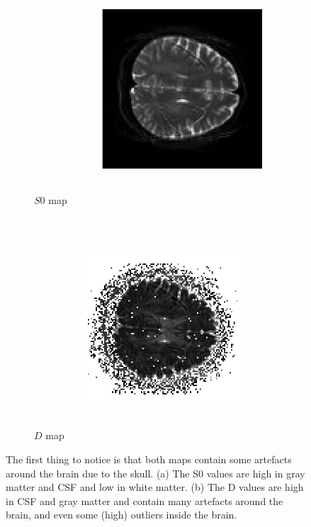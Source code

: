 \documentclass[11pt,a4paper,oneside]{report}
\begin{document}
\begin{figure}[H]
  \centering
  \begin{subfigure}[b]{0.5\textwidth}
      \centering
    \includegraphics[scale=1]{figures/q1/q114-S0.eps}
    \caption{$S0$ map}
    \label{q114-S0}
  \end{subfigure}%
  ~
  \begin{subfigure}[b]{0.5\textwidth}
      \centering
    \includegraphics[scale=1]{figures/q1/q114-D.eps}
    \caption{$D$ map}
    \label{q114-D}
  \end{subfigure}%
  \caption{The first thing to notice is that both maps contain some artefacts around the brain due to the skull. (a) The S0 values are high in gray matter and CSF and low in white matter. (b) The D values are high in CSF and gray matter and contain many artefacts around the brain, and even some (high) outliers inside the brain.}

\end{figure}
\end{document}
